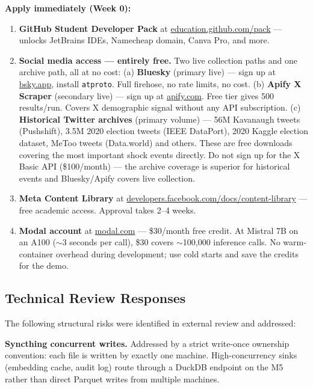 \documentclass[11pt]{article}
\begin{document}
\medskip
\noindent\textbf{Apply immediately (Week 0):}
\begin{enumerate}[leftmargin=2em, itemsep=2pt]
  \item \textbf{GitHub Student Developer Pack} at \url{education.github.com/pack}
        --- unlocks JetBrains IDEs, Namecheap domain, Canva Pro, and more.
  \item \textbf{Social media access --- entirely free.} Two live collection paths
        and one archive path, all at no cost:
        (a) \textbf{Bluesky} (primary live) --- sign up at \url{bsky.app}, install
        \texttt{atproto}. Full firehose, no rate limits, no cost.
        (b) \textbf{Apify X Scraper} (secondary live) --- sign up at \url{apify.com}.
        Free tier gives 500 results/run. Covers X demographic signal without any
        API subscription.
        (c) \textbf{Historical Twitter archives} (primary volume) --- 56M Kavanaugh
        tweets (Pushshift), 3.5M 2020 election tweets (IEEE DataPort), 2020 Kaggle
        election dataset, MeToo tweets (Data.world) and others. These are free
        downloads covering the most important shock events directly.
        Do not sign up for the X Basic API (\$100/month) --- the archive coverage
        is superior for historical events and Bluesky/Apify covers live collection.
  \item \textbf{Meta Content Library} at \url{developers.facebook.com/docs/content-library}
        --- free academic access. Approval takes 2--4 weeks.
  \item \textbf{Modal account} at \url{modal.com} --- \$30/month free credit.
        At Mistral 7B on an A100 ($\sim$3 seconds per call), \$30 covers
        $\sim$100{,}000 inference calls. No warm-container overhead during
        development; use cold starts and save the credits for the demo.
\end{enumerate}

\subsection*{Technical Review Responses}

The following structural risks were identified in external review and addressed:

\textbf{Syncthing concurrent writes.} Addressed by a strict write-once ownership
convention: each file is written by exactly one machine. High-concurrency sinks
(embedding cache, audit log) route through a DuckDB endpoint on the M5 rather
than direct Parquet writes from multiple machines.
\end{document}
